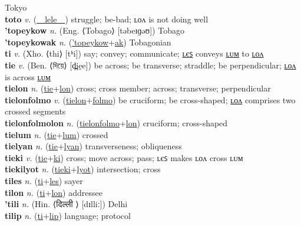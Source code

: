 Tokyo \label{'tokyo} \\
\textbf{toto} \textit{v.} (\hyperref[lele]{~~lele~~})
struggle; be-bad; ʟᴏᴧ is not doing well \label{toto} \\
\textbf{'topeykow} \textit{n.} (Eng. ⟨Tobago⟩ [təbeɪɡəʊ])
Tobago \label{'topeykow} \\
\textbf{'topeykowak} \textit{n.} (\hyperref['topeykow]{'topeykow}+\hyperref[ak]{ak})
Tobagonian \label{'topeykowak} \\
\textbf{ti} \textit{v.} (Xho. ⟨thi⟩ [tʰi])
say; convey; communicate; \hyperref[tiles]{ʟєꜱ} conveys \hyperref[tilum]{ʟᴜᴍ} to \hyperref[tilon]{ʟᴏᴧ} \label{ti} \\
\textbf{tie} \textit{v.} (Ben. ⟨দিয়ে⟩ [d̪ie̯e])
be across; be transverse; straddle; be perpendicular; \hyperref[tielon]{ʟᴏᴧ} is across \hyperref[tielum]{ʟᴜᴍ} \label{tie} \\
\textbf{tielon} \textit{n.} (\hyperref[tie]{tie}+\hyperref[lon]{lon})
cross; cross member; across; transverse; perpendicular \label{tielon} \\
\textbf{tielonfolmo} \textit{v.} (\hyperref[tielon]{tielon}+\hyperref[folmo]{folmo})
be cruciform; be cross-shaped; \hyperref[tielonfolmolon]{ʟᴏᴧ} comprises two crossed segments \label{tielonfolmo} \\
\textbf{tielonfolmolon} \textit{n.} (\hyperref[tielonfolmo]{tielonfolmo}+\hyperref[lon]{lon})
cruciform; cross-shaped \label{tielonfolmolon} \\
\textbf{tielum} \textit{n.} (\hyperref[tie]{tie}+\hyperref[lum]{lum})
crossed \label{tielum} \\
\textbf{tielyan} \textit{n.} (\hyperref[tie]{tie}+\hyperref[lyan]{lyan})
transverseness; obliqueness \label{tielyan} \\
\textbf{tieki} \textit{v.} (\hyperref[tie]{tie}+\hyperref[ki]{ki})
cross; move across; pass; ʟєꜱ makes ʟᴏᴧ cross ʟᴜᴍ \label{tieki} \\
\textbf{tiekilyot} \textit{n.} (\hyperref[tieki]{tieki}+\hyperref[lyot]{lyot})
intersection; cross \label{tiekilyot} \\
\textbf{tiles} \textit{n.} (\hyperref[ti]{ti}+\hyperref[les]{les})
sayer \label{tiles} \\
\textbf{tilon} \textit{n.} (\hyperref[ti]{ti}+\hyperref[lon]{lon})
addressee \label{tilon} \\
\textbf{'tili} \textit{n.} (Hin. ⟨दिल्ली ⟩ [dɪlliː])
Delhi \label{'tili} \\
\textbf{tilip} \textit{n.} (\hyperref[ti]{ti}+\hyperref[lip]{lip})
language; protocol \label{tilip} \\
